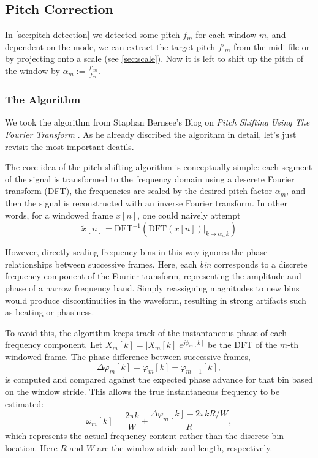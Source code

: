 \documentclass[sigconf]{acmart}
\begin{document}
    \subsection{Pitch Correction}
    \label{sec:pitch-correction}
    In \ref{sec:pitch-detection} we detected some pitch $f_m$ for each window $m$, and dependent on the mode, we can extract the target pitch $f'_m$ from the midi file or by projecting onto a scale (see \ref{sec:scale}). Now it is left to shift up the pitch of the window by $\alpha_m := \frac{f'_m}{f_m}$.

    \subsubsection{The Algorithm}
    \label{sec:pitch-correction-algo}
    We took the algorithm from Staphan Bernsee's Blog on \textit{Pitch Shifting Using The Fourier Transform} \cite{bernsee_pitch_shifting_ft}. As he already discribed the algorithm in detail, let's just revisit the most important deatils.

    The core idea of the pitch shifting algorithm is conceptually simple: each segment of the signal is transformed to the frequency domain using a descrete Fourier transform (DFT), the frequencies are scaled by the desired pitch factor $\alpha_m$, and then the signal is reconstructed with an inverse Fourier transform. In other words, for a windowed frame $x[n]$, one could naively attempt
    $$
    \tilde{x}[n] = \text{DFT}^{-1}\left(\text{DFT}(x[n]) \big|_{k \mapsto \alpha_m k}\right)
    $$

    However, directly scaling frequency bins in this way ignores the phase relationships between successive frames. Here, each \emph{bin} corresponds to a discrete frequency component of the Fourier transform, representing the amplitude and phase of a narrow frequency band. Simply reassigning magnitudes to new bins would produce discontinuities in the waveform, resulting in strong artifacts such as beating or phasiness.

    To avoid this, the algorithm keeps track of the instantaneous phase of each frequency component. Let $X_m[k] = |X_m[k]| e^{j \phi_m[k]}$ be the DFT of the $m$-th windowed frame. The phase difference between successive frames,
    $$
    \Delta \varphi_m[k] = \varphi_m[k] - \varphi_{m-1}[k],
    $$
    is computed and compared against the expected phase advance for that bin based on the window stride. This allows the true instantaneous frequency to be estimated:
    $$
    \omega_m[k] = \frac{2 \pi k}{W} + \frac{\Delta \varphi_m[k] - 2 \pi k R / W}{R},
    $$
    which represents the actual frequency content rather than the discrete bin location. Here $R$ and $W$ are the window stride and length, respectively.
\end{document}
